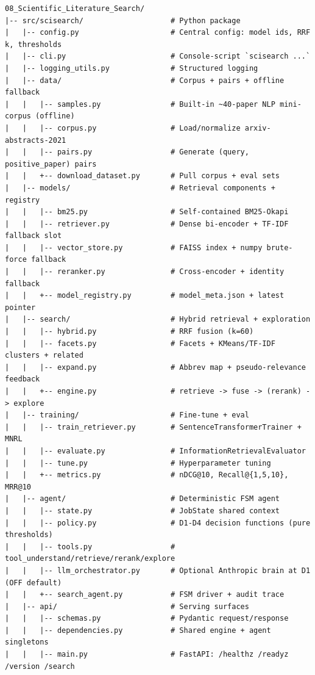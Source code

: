 \documentclass[12pt,a4paper]{article}
\begin{document}
\begin{lstlisting}[basicstyle=\ttfamily\footnotesize]
08_Scientific_Literature_Search/
|-- src/scisearch/                    # Python package
|   |-- config.py                     # Central config: model ids, RRF k, thresholds
|   |-- cli.py                        # Console-script `scisearch ...`
|   |-- logging_utils.py              # Structured logging
|   |-- data/                         # Corpus + pairs + offline fallback
|   |   |-- samples.py                # Built-in ~40-paper NLP mini-corpus (offline)
|   |   |-- corpus.py                 # Load/normalize arxiv-abstracts-2021
|   |   |-- pairs.py                  # Generate (query, positive_paper) pairs
|   |   +-- download_dataset.py       # Pull corpus + eval sets
|   |-- models/                       # Retrieval components + registry
|   |   |-- bm25.py                   # Self-contained BM25-Okapi
|   |   |-- retriever.py              # Dense bi-encoder + TF-IDF fallback slot
|   |   |-- vector_store.py           # FAISS index + numpy brute-force fallback
|   |   |-- reranker.py               # Cross-encoder + identity fallback
|   |   +-- model_registry.py         # model_meta.json + latest pointer
|   |-- search/                       # Hybrid retrieval + exploration
|   |   |-- hybrid.py                 # RRF fusion (k=60)
|   |   |-- facets.py                 # Facets + KMeans/TF-IDF clusters + related
|   |   |-- expand.py                 # Abbrev map + pseudo-relevance feedback
|   |   +-- engine.py                 # retrieve -> fuse -> (rerank) -> explore
|   |-- training/                     # Fine-tune + eval
|   |   |-- train_retriever.py        # SentenceTransformerTrainer + MNRL
|   |   |-- evaluate.py               # InformationRetrievalEvaluator
|   |   |-- tune.py                   # Hyperparameter tuning
|   |   +-- metrics.py                # nDCG@10, Recall@{1,5,10}, MRR@10
|   |-- agent/                        # Deterministic FSM agent
|   |   |-- state.py                  # JobState shared context
|   |   |-- policy.py                 # D1-D4 decision functions (pure thresholds)
|   |   |-- tools.py                  # tool_understand/retrieve/rerank/explore
|   |   |-- llm_orchestrator.py       # Optional Anthropic brain at D1 (OFF default)
|   |   +-- search_agent.py           # FSM driver + audit trace
|   |-- api/                          # Serving surfaces
|   |   |-- schemas.py                # Pydantic request/response
|   |   |-- dependencies.py           # Shared engine + agent singletons
|   |   |-- main.py                   # FastAPI: /healthz /readyz /version /search

\end{lstlisting}
\end{document}
